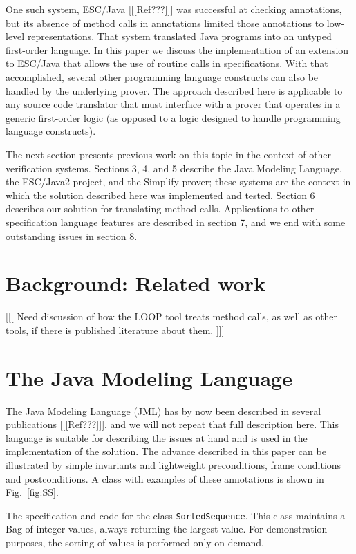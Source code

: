 \documentclass{sig-alternate}
\begin{document}
One such system,
ESC/Java [[[Ref???]]] was successful at checking annotations, but its
absence of method calls in annotations limited those annotations to
low-level representations.  That system translated Java programs into
an untyped first-order language.  In this paper we discuss the implementation
of an extension to ESC/Java that allows the use of routine calls in
specifications.  With that accomplished, several other programming
language constructs can also be handled by the underlying prover.
The approach described here is applicable to any source code translator
that must interface with a prover that operates in a generic first-order 
logic (as opposed to a logic designed to handle programming language
constructs).

The next section presents previous work on this topic in the context of other
verification systems.  Sections 3, 4, and 5 describe the Java Modeling
Language, the ESC/Java2 project, and the Simplify prover; these systems
are the context in which the solution described here was implemented 
and tested.  Section 6 describes our solution for translating method calls.
Applications to other specification language features are described in section 7,
and we end with some outstanding issues in section 8.

\section{Background: Related work}

[[[ Need discussion of how the LOOP tool treats method calls, as well as other tools, if there is published literature about them. ]]]

\section{The Java Modeling Language}

The Java Modeling Language (JML) has by now been described in several publications
[[[Ref???]]], and we will not repeat that full description here.  This language is suitable for
describing the issues at hand and is used in the implementation of the solution.
 The advance described in this paper
can be illustrated by simple invariants and lightweight preconditions,
frame conditions and postconditions.  
A class with examples of these annotations is shown in Fig.~\ref{fig:SS}.

\begin{BFIGURE}

\caption{The specification and code for the class \texttt{SortedSequence}.  This class maintains a Bag of integer values, always returning the largest value.  For demonstration purposes, 
the sorting of values is performed only on demand.}
\label{fig:SS}
\end{BFIGURE}
\end{document}

